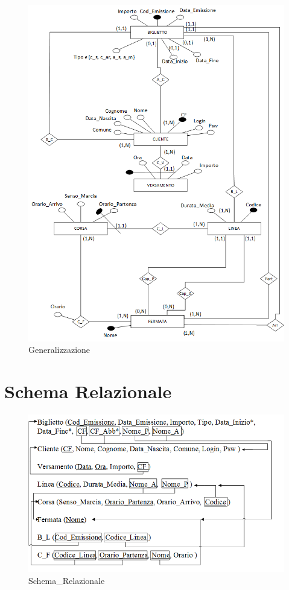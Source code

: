\documentclass[a4paper,11pt]{book}
\begin{document}
\begin{figure}[!ht]
\centering
\includegraphics[scale = 0.3]{Generalizzazione.png}
\caption{Generalizzazione}
\end{figure}

\chapter{Schema Relazionale}

\begin{figure}[!ht]
\centering
\includegraphics[scale = 0.3]{Schema_Relazionale.png}
\caption{Schema_Relazionale}
\end{figure}
\end{document}
